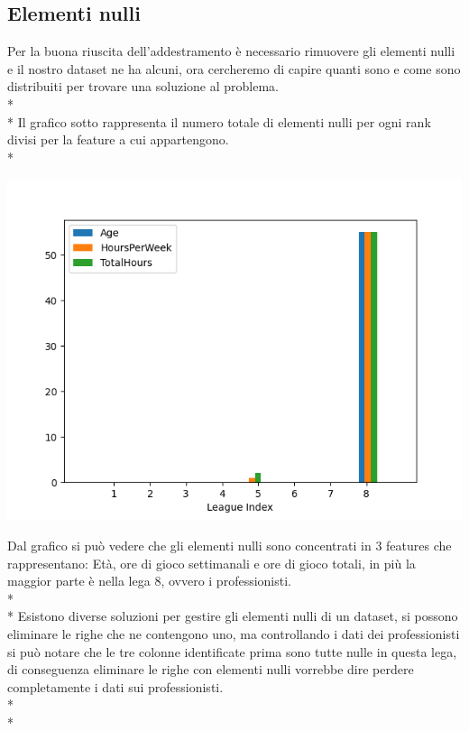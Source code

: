 \subsection{Elementi nulli}\label{ssec:nulli}
\normalsize
\par
Per la buona riuscita dell’addestramento è necessario rimuovere gli elementi nulli e il nostro dataset ne ha alcuni, ora cercheremo di capire quanti sono e come sono distribuiti per trovare una soluzione al problema.\\*\\*
Il grafico sotto rappresenta il numero totale di elementi nulli per ogni rank divisi per la feature a cui appartengono.\\*
\begin{center}
	\includegraphics[scale=0.9]{../figures/Nan_distribuzione.PNG}
\end{center}
\par
Dal grafico si può vedere che gli elementi nulli sono concentrati in 3 features che rappresentano: Età, ore di gioco settimanali e ore di gioco totali, in più la maggior parte è nella lega 8, ovvero i professionisti. \\*\\*
Esistono diverse soluzioni per gestire gli elementi nulli di un dataset, si possono eliminare le righe che ne contengono uno, ma controllando i dati dei professionisti si può notare che le tre colonne identificate prima sono tutte nulle in questa lega, di conseguenza eliminare le righe con elementi nulli vorrebbe dire perdere completamente i dati sui professionisti.\\*\\*
